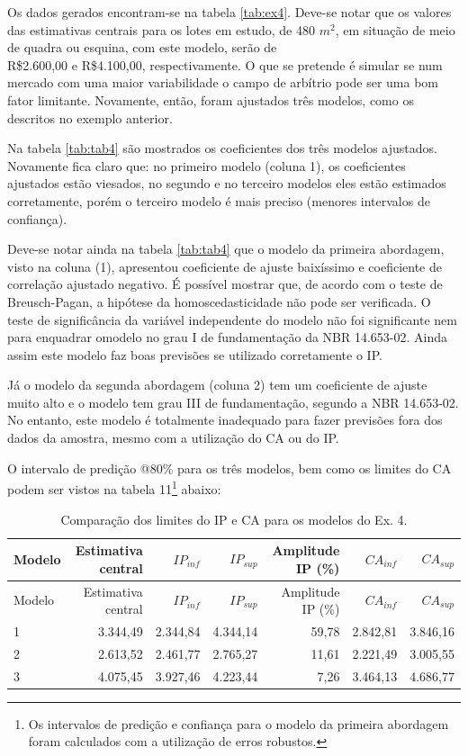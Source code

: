 \documentclass[
  a4paper, 11pt]{article}
\begin{document}
Os dados gerados encontram-se na tabela \ref{tab:ex4}. Deve-se notar que
os valores das estimativas centrais para os lotes em estudo, de 480
\(m^2\), em situação de meio de quadra ou esquina, com este modelo,
serão de\\
R\$2.600,00 e R\$4.100,00, respectivamente. O que se pretende é simular
se num mercado com uma maior variabilidade o campo de arbítrio pode ser
uma bom fator limitante. Novamente, então, foram ajustados três modelos,
como os descritos no exemplo anterior.

Na tabela \ref{tab:tab4} são mostrados os coeficientes dos três modelos
ajustados. Novamente fica claro que: no primeiro modelo (coluna 1), os
coeficientes ajustados estão viesados, no segundo e no terceiro modelos
eles estão estimados corretamente, porém o terceiro modelo é mais
preciso (menores intervalos de confiança).

Deve-se notar ainda na tabela \ref{tab:tab4} que o modelo da primeira
abordagem, visto na coluna (1), apresentou coeficiente de ajuste
baixíssimo e coeficiente de correlação ajustado negativo. É possível
mostrar que, de acordo com o teste de Breusch-Pagan, a hipótese da
homoscedasticidade não pode ser verificada. O teste de significância da
variável independente do modelo não foi significante nem para enquadrar
omodelo no grau I de fundamentação da NBR 14.653-02. Ainda assim este
modelo faz boas previsões se utilizado corretamente o IP.

Já o modelo da segunda abordagem (coluna 2) tem um coeficiente de ajuste
muito alto e o modelo tem grau III de fundamentação, segundo a NBR
14.653-02. No entanto, este modelo é totalmente inadequado para fazer
previsões fora dos dados da amostra, mesmo com a utilização do CA ou do
IP.

O intervalo de predição @80\% para os três modelos, bem como os limites
do CA podem ser vistos na tabela 11\footnote{Os intervalos de predição e
  confiança para o modelo da primeira abordagem foram calculados com a
  utilização de erros robustos.} abaixo:

\begin{longtable}[]{@{}lrrrrrr@{}}
\caption{Comparação dos limites do IP e CA para os modelos do Ex.
4.}\tabularnewline
\toprule
Modelo & Estimativa central & \(IP_{inf}\) & \(IP_{sup}\) & Amplitude IP
(\%) & \(CA_{inf}\) & \(CA_{sup}\)\tabularnewline
\midrule
\endfirsthead
\toprule
Modelo & Estimativa central & \(IP_{inf}\) & \(IP_{sup}\) & Amplitude IP
(\%) & \(CA_{inf}\) & \(CA_{sup}\)\tabularnewline
\midrule
\endhead
1 & 3.344,49 & 2.344,84 & 4.344,14 & 59,78 & 2.842,81 &
3.846,16\tabularnewline
2 & 2.613,52 & 2.461,77 & 2.765,27 & 11,61 & 2.221,49 &
3.005,55\tabularnewline
3 & 4.075,45 & 3.927,46 & 4.223,44 & 7,26 & 3.464,13 &
4.686,77\tabularnewline
\bottomrule
\end{longtable}
\end{document}
